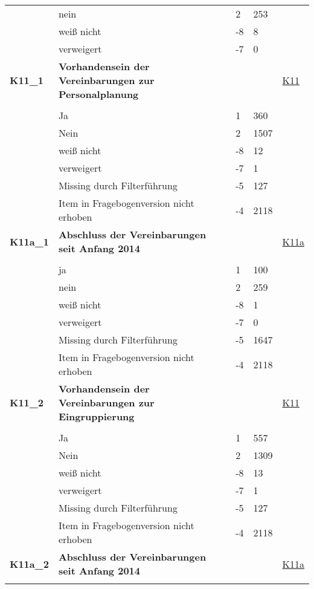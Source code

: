 \begin{longtable}{| L{2.5cm} | L{8.25cm}| C{1.5cm} | R{1.25cm} | C{2.25cm} |  }
   & nein & 2 & 253 &  \\ 
   & weiß nicht & -8 & 8 &  \\ 
   & verweigert & -7 & 0 &  \\ 
   \midrule
\textbf{K11\_1}\label{var:suf:K11:1} & \textbf{Vorhandensein der Vereinbarungen zur Personalplanung} &  &  & \hyperref[K11]{K11} \\ 
   &  &  &  &  \\ 
   & Ja & 1 & 360 &  \\ 
   & Nein & 2 & 1507 &  \\ 
   & weiß nicht & -8 & 12 &  \\ 
   & verweigert & -7 & 1 &  \\ 
   & Missing durch Filterführung & -5 & 127 &  \\ 
   & Item in Fragebogenversion nicht erhoben & -4 & 2118 &  \\ 
   \midrule
\textbf{K11a\_1}\label{var:suf:K11a:1} & \textbf{Abschluss der Vereinbarungen seit Anfang 2014} &  &  & \hyperref[K11a]{K11a} \\ 
   &  &  &  &  \\ 
   & ja & 1 & 100 &  \\ 
   & nein & 2 & 259 &  \\ 
   & weiß nicht & -8 & 1 &  \\ 
   & verweigert & -7 & 0 &  \\ 
   & Missing durch Filterführung & -5 & 1647 &  \\ 
   & Item in Fragebogenversion nicht erhoben & -4 & 2118 &  \\ 
   \midrule
\textbf{K11\_2}\label{var:suf:K11:2} & \textbf{Vorhandensein der Vereinbarungen zur Eingruppierung} &  &  & \hyperref[K11]{K11} \\ 
   &  &  &  &  \\ 
   & Ja & 1 & 557 &  \\ 
   & Nein & 2 & 1309 &  \\ 
   & weiß nicht & -8 & 13 &  \\ 
   & verweigert & -7 & 1 &  \\ 
   & Missing durch Filterführung & -5 & 127 &  \\ 
   & Item in Fragebogenversion nicht erhoben & -4 & 2118 &  \\ 
   \midrule
\textbf{K11a\_2}\label{var:suf:K11a:2} & \textbf{Abschluss der Vereinbarungen seit Anfang 2014} &  &  & \hyperref[K11a]{K11a} \\ 
   &  &  &  &  \\ 

\end{longtable}
